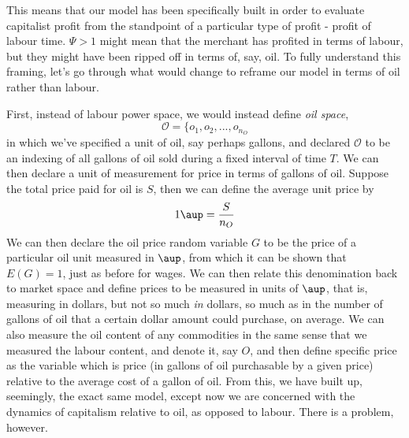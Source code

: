 This means that our model has been specifically built in order to evaluate capitalist profit from the standpoint of a particular type of profit - profit of labour time. $\Psi > 1$ might mean that the merchant has profited in terms of labour, but they might have been ripped off in terms of, say, oil. To fully understand this framing, let's go through what would change to reframe our model in terms of oil rather than labour. \par 
First, instead of labour power space, we would instead define \textit{oil space}, 
\[ \mathcal{O} = \{o_1,o_2,...,o_{n_O} \]
in which we've specified a unit of oil, say perhaps gallons, and declared $\mathcal{O}$ to be an indexing of all gallons of oil sold during a fixed interval of time $T$. We can then declare a unit of measurement for price in terms of gallons of oil. Suppose the total price paid for oil is $S$, then we can define the average unit price by
\[ 1 \aup = \frac{S}{n_O} \]
We can then declare the oil price random variable $G$ to be the price of a particular oil unit measured in $\aup$, from which it can be shown that $E(G) = 1$, just as before for wages. We can then relate this denomination back to market space and define prices to be measured in units of $\aup$, that is, measuring in dollars, but not so much \textit{in} dollars, so much as in the number of gallons of oil that a certain dollar amount could purchase, on average. We can also measure the oil content of any commodities in the same sense that we measured the labour content, and denote it, say $O$, and then define specific price as the variable which is price (in gallons of oil purchasable by a given price) relative to the average cost of a gallon of oil. From this, we have built up, seemingly, the exact same model, except now we are concerned with the dynamics of capitalism relative to oil, as opposed to labour. There is a problem, however. \par 
